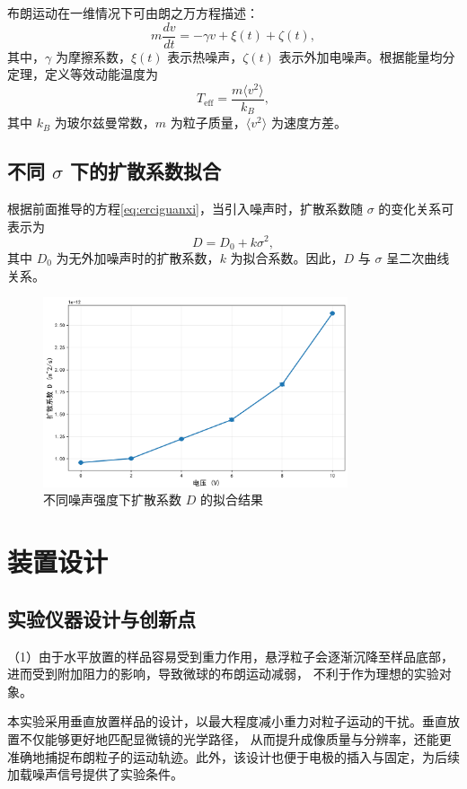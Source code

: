 \documentclass[a4paper]{report} %
\begin{document}
布朗运动在一维情况下可由朗之万方程描述：
\begin{equation}
  m \frac{dv}{dt} = -\gamma v + \xi(t) + \zeta(t),
\end{equation}
其中，$\gamma$ 为摩擦系数，$\xi(t)$ 表示热噪声，$\zeta(t)$ 表示外加电噪声。根据能量均分定理，定义等效动能温度为
\begin{equation}
  T_{\text{eff}} = \frac{m \langle v^2 \rangle}{k_B},
\end{equation}
其中 $k_B$ 为玻尔兹曼常数，$m$ 为粒子质量，$\langle v^2 \rangle$ 为速度方差。

\section{不同 $\sigma$ 下的扩散系数拟合}

根据前面推导的方程\eqref{eq:erciguanxi}，当引入噪声时，扩散系数随 $\sigma$ 的变化关系可表示为
\begin{equation}
  D = D_0 + k\sigma^2,
  \label{eq:D_sigma}
\end{equation}
其中 $D_0$ 为无外加噪声时的扩散系数，$k$ 为拟合系数。因此，$D$ 与 $\sigma$ 呈二次曲线关系。

\begin{figure}[H]
  \centering
  \includegraphics[width=0.8\textwidth]{fit.png}
  \caption{不同噪声强度下扩散系数 $D$ 的拟合结果}
  \label{fig:fit}
\end{figure}


\chapter{装置设计}
\section{实验仪器设计与创新点}
（1）由于水平放置的样品容易受到重力作用，悬浮粒子会逐渐沉降至样品底部，进而受到附加阻力的影响，导致微球的布朗运动减弱，
不利于作为理想的实验对象\cite{einstein1905,dhont1996brownian}。\par
本实验采用垂直放置样品的设计，以最大程度减小重力对粒子运动的干扰。垂直放置不仅能够更好地匹配显微镜的光学路径，
从而提升成像质量与分辨率，还能更准确地捕捉布朗粒子的运动轨迹。此外，该设计也便于电极的插入与固定，为后续加载噪声信号提供了实验条件。\par
\end{document}

